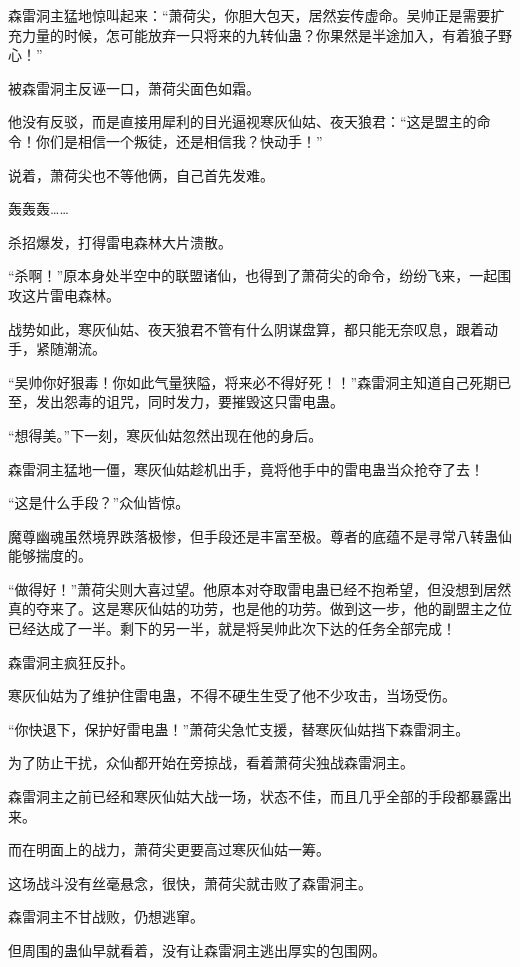 \begin{this_body}
森雷洞主猛地惊叫起来：“萧荷尖，你胆大包天，居然妄传虚命。吴帅正是需要扩充力量的时候，怎可能放弃一只将来的九转仙蛊？你果然是半途加入，有着狼子野心！”

被森雷洞主反诬一口，萧荷尖面色如霜。

他没有反驳，而是直接用犀利的目光逼视寒灰仙姑、夜天狼君：“这是盟主的命令！你们是相信一个叛徒，还是相信我？快动手！”

说着，萧荷尖也不等他俩，自己首先发难。

轰轰轰……

杀招爆发，打得雷电森林大片溃散。

“杀啊！”原本身处半空中的联盟诸仙，也得到了萧荷尖的命令，纷纷飞来，一起围攻这片雷电森林。

战势如此，寒灰仙姑、夜天狼君不管有什么阴谋盘算，都只能无奈叹息，跟着动手，紧随潮流。

“吴帅你好狠毒！你如此气量狭隘，将来必不得好死！！”森雷洞主知道自己死期已至，发出怨毒的诅咒，同时发力，要摧毁这只雷电蛊。

“想得美。”下一刻，寒灰仙姑忽然出现在他的身后。

森雷洞主猛地一僵，寒灰仙姑趁机出手，竟将他手中的雷电蛊当众抢夺了去！

“这是什么手段？”众仙皆惊。

魔尊幽魂虽然境界跌落极惨，但手段还是丰富至极。尊者的底蕴不是寻常八转蛊仙能够揣度的。

“做得好！”萧荷尖则大喜过望。他原本对夺取雷电蛊已经不抱希望，但没想到居然真的夺来了。这是寒灰仙姑的功劳，也是他的功劳。做到这一步，他的副盟主之位已经达成了一半。剩下的另一半，就是将吴帅此次下达的任务全部完成！

森雷洞主疯狂反扑。

寒灰仙姑为了维护住雷电蛊，不得不硬生生受了他不少攻击，当场受伤。

“你快退下，保护好雷电蛊！”萧荷尖急忙支援，替寒灰仙姑挡下森雷洞主。

为了防止干扰，众仙都开始在旁掠战，看着萧荷尖独战森雷洞主。

森雷洞主之前已经和寒灰仙姑大战一场，状态不佳，而且几乎全部的手段都暴露出来。

而在明面上的战力，萧荷尖更要高过寒灰仙姑一筹。

这场战斗没有丝毫悬念，很快，萧荷尖就击败了森雷洞主。

森雷洞主不甘战败，仍想逃窜。

但周围的蛊仙早就看着，没有让森雷洞主逃出厚实的包围网。


\end{this_body}
